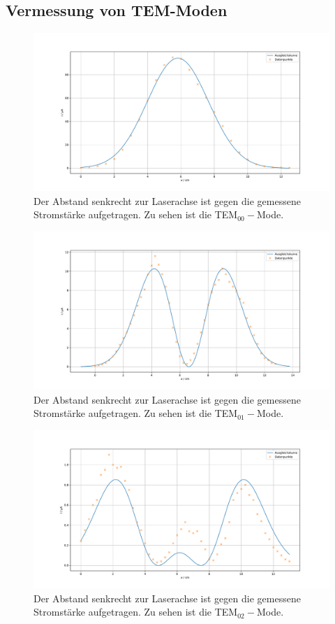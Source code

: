 \subsection{Vermessung von TEM-Moden}

\begin{figure}
    \centering
    \includegraphics[width=12cm]{plots/mode0.pdf}
    \caption{Der Abstand senkrecht zur Laserachse ist gegen die gemessene Stromstärke aufgetragen. Zu sehen ist die TEM$_{00}-$Mode.}
    \label{fig:mode0}
\end{figure}

\begin{figure}
    \centering
    \includegraphics[width=12cm]{plots/mode1.pdf}
    \caption{Der Abstand senkrecht zur Laserachse ist gegen die gemessene Stromstärke aufgetragen. Zu sehen ist die TEM$_{01}-$Mode.}
    \label{fig:mode1}
\end{figure}

\begin{figure}
    \centering
    \includegraphics[width=12cm]{plots/mode2.pdf}
    \caption{Der Abstand senkrecht zur Laserachse ist gegen die gemessene Stromstärke aufgetragen. Zu sehen ist die TEM$_{02}-$Mode.}
    \label{fig:mode2}
\end{figure}

